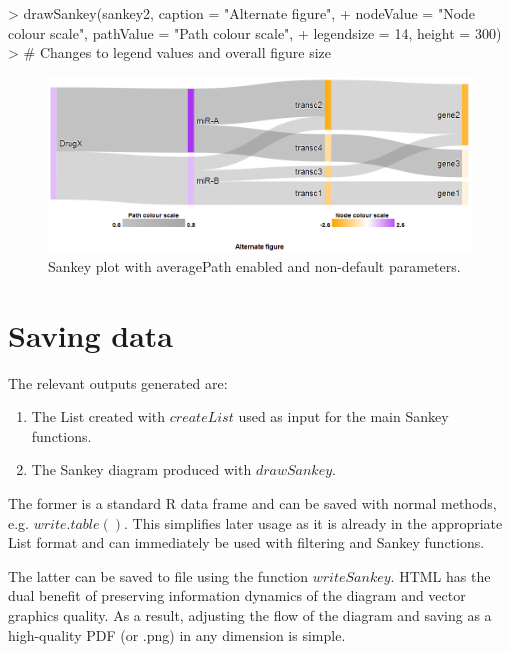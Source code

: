 \documentclass[a4paper]{article}
\begin{document}
\begin{Schunk}
\end{Schunk}
\begin{Schunk}
\begin{Sinput}
> drawSankey(sankey2, caption = "Alternate figure",
+     nodeValue = "Node colour scale", pathValue = "Path colour scale",
+     legendsize = 14, height = 300)
> # Changes to legend values and overall figure size
\end{Sinput}
\end{Schunk}

\begin{figure}[htbp]
    \begin{center}
    \includegraphics[width=\textwidth]{figure3.png}
    \caption{Sankey plot with averagePath enabled and non-default parameters.}
    \label{fig:Custom}
    \end{center}
\end{figure}

\section{Saving data}
The relevant outputs generated are:
\begin{enumerate}
    \item The List created with $createList$ used as input for the main Sankey functions.
    \item The Sankey diagram produced with $drawSankey$.
\end{enumerate}
The former is a standard R data frame and can be saved with normal methods, e.g. $write.table()$. This simplifies later usage as it is already in the appropriate List format and can immediately be used with filtering and Sankey functions.

The latter can be saved to file using the function $writeSankey$. HTML has the dual benefit of preserving information dynamics of the diagram and vector graphics quality. As a result, adjusting the flow of the diagram and saving as a high-quality PDF (or .png) in any dimension is simple.
\end{document}
